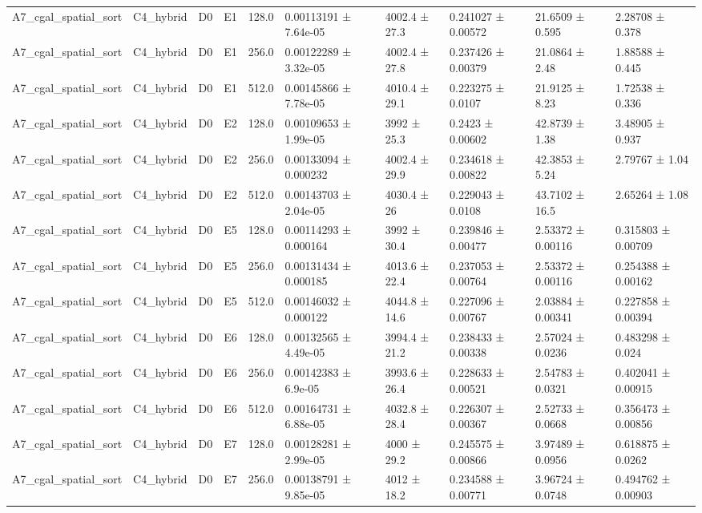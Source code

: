 \begin{table}
\begin{tabular}{llllllllll}
A7\_cgal\_spatial\_sort & C4\_hybrid & D0 & E1 & 128.0 & 0.00113191 ± 7.64e-05 & 4002.4 ± 27.3 & 0.241027 ± 0.00572 & 21.6509 ± 0.595 & 2.28708 ± 0.378 \\
A7\_cgal\_spatial\_sort & C4\_hybrid & D0 & E1 & 256.0 & 0.00122289 ± 3.32e-05 & 4002.4 ± 27.8 & 0.237426 ± 0.00379 & 21.0864 ± 2.48 & 1.88588 ± 0.445 \\
A7\_cgal\_spatial\_sort & C4\_hybrid & D0 & E1 & 512.0 & 0.00145866 ± 7.78e-05 & 4010.4 ± 29.1 & 0.223275 ± 0.0107 & 21.9125 ± 8.23 & 1.72538 ± 0.336 \\
A7\_cgal\_spatial\_sort & C4\_hybrid & D0 & E2 & 128.0 & 0.00109653 ± 1.99e-05 & 3992 ± 25.3 & 0.2423 ± 0.00602 & 42.8739 ± 1.38 & 3.48905 ± 0.937 \\
A7\_cgal\_spatial\_sort & C4\_hybrid & D0 & E2 & 256.0 & 0.00133094 ± 0.000232 & 4002.4 ± 29.9 & 0.234618 ± 0.00822 & 42.3853 ± 5.24 & 2.79767 ± 1.04 \\
A7\_cgal\_spatial\_sort & C4\_hybrid & D0 & E2 & 512.0 & 0.00143703 ± 2.04e-05 & 4030.4 ± 26 & 0.229043 ± 0.0108 & 43.7102 ± 16.5 & 2.65264 ± 1.08 \\
A7\_cgal\_spatial\_sort & C4\_hybrid & D0 & E5 & 128.0 & 0.00114293 ± 0.000164 & 3992 ± 30.4 & 0.239846 ± 0.00477 & 2.53372 ± 0.00116 & 0.315803 ± 0.00709 \\
A7\_cgal\_spatial\_sort & C4\_hybrid & D0 & E5 & 256.0 & 0.00131434 ± 0.000185 & 4013.6 ± 22.4 & 0.237053 ± 0.00764 & 2.53372 ± 0.00116 & 0.254388 ± 0.00162 \\
A7\_cgal\_spatial\_sort & C4\_hybrid & D0 & E5 & 512.0 & 0.00146032 ± 0.000122 & 4044.8 ± 14.6 & 0.227096 ± 0.00767 & 2.03884 ± 0.00341 & 0.227858 ± 0.00394 \\
A7\_cgal\_spatial\_sort & C4\_hybrid & D0 & E6 & 128.0 & 0.00132565 ± 4.49e-05 & 3994.4 ± 21.2 & 0.238433 ± 0.00338 & 2.57024 ± 0.0236 & 0.483298 ± 0.024 \\
A7\_cgal\_spatial\_sort & C4\_hybrid & D0 & E6 & 256.0 & 0.00142383 ± 6.9e-05 & 3993.6 ± 26.4 & 0.228633 ± 0.00521 & 2.54783 ± 0.0321 & 0.402041 ± 0.00915 \\
A7\_cgal\_spatial\_sort & C4\_hybrid & D0 & E6 & 512.0 & 0.00164731 ± 6.88e-05 & 4032.8 ± 28.4 & 0.226307 ± 0.00367 & 2.52733 ± 0.0668 & 0.356473 ± 0.00856 \\
A7\_cgal\_spatial\_sort & C4\_hybrid & D0 & E7 & 128.0 & 0.00128281 ± 2.99e-05 & 4000 ± 29.2 & 0.245575 ± 0.00866 & 3.97489 ± 0.0956 & 0.618875 ± 0.0262 \\
A7\_cgal\_spatial\_sort & C4\_hybrid & D0 & E7 & 256.0 & 0.00138791 ± 9.85e-05 & 4012 ± 18.2 & 0.234588 ± 0.00771 & 3.96724 ± 0.0748 & 0.494762 ± 0.00903 \\

\end{tabular}
\end{table}
